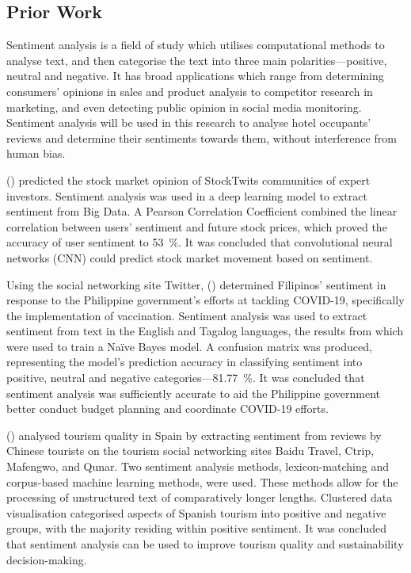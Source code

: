 \documentclass[12pt, twoside, a4paper, draft]{pancake-article}
\begin{document}
\subsection{Prior Work}
Sentiment analysis is a field of study which utilises computational methods to analyse text,
and then categorise the text into three main polarities---positive, neutral and negative. It
has broad applications which range from determining consumers' opinions in sales and product
analysis to competitor research in marketing, and even detecting public opinion in social media
monitoring. Sentiment analysis will be used in this research to analyse hotel occupants' reviews
and determine their sentiments towards them, without interference from human bias.

\citeauthor{stock} (\citeyear{stock}) predicted the stock market opinion of StockTwits communities of expert
investors. Sentiment analysis was used in a deep learning model to extract sentiment from Big Data.
A Pearson Correlation Coefficient combined the linear correlation between users' sentiment and
future stock prices, which proved the accuracy of user sentiment to \qty{53}{\percent}. It was
concluded that convolutional neural networks (CNN) could predict stock market movement based on
sentiment.

Using the social networking site Twitter, \citeauthor{twitter} (\citeyear{twitter}) determined
Filipinos' sentiment in response to the Philippine government's efforts at tackling COVID-19,
specifically the implementation of vaccination. Sentiment analysis was used to extract sentiment
from text in the English and Tagalog languages, the results from which were used to train a Naïve
Bayes model. A confusion matrix was produced, representing the model's prediction accuracy
in classifying sentiment into positive, neutral and negative categories---\qty{81.77}{\percent}.
It was concluded that sentiment analysis was sufficiently accurate to aid the Philippine government
better conduct budget planning and coordinate COVID-19 efforts.

\citeauthor{spain} (\citeyear{spain}) analysed tourism quality in Spain
by extracting sentiment from reviews by Chinese tourists on the tourism
social networking sites Baidu Travel, Ctrip, Mafengwo, and Qunar.
Two sentiment analysis methods, lexicon-matching and corpus-based machine
learning methods, were used. These methods allow for the processing of
unstructured text of comparatively longer lengths. Clustered data
visualisation categorised aspects of Spanish tourism into positive
and negative groups, with the majority residing within positive sentiment.
It was concluded that sentiment analysis can be used to improve tourism
quality and sustainability decision-making.
\end{document}
